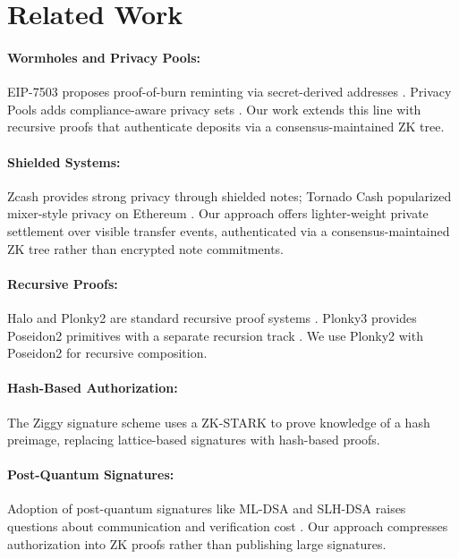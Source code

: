 \documentclass{iacrcc}
\begin{document}
\section{Related Work}
\label{sec:related}

\paragraph{Wormholes and Privacy Pools:}
EIP-7503 proposes proof-of-burn reminting via secret-derived addresses \cite{eip7503}. Privacy Pools adds compliance-aware privacy sets \cite{privacypools}. Our work extends this line with recursive proofs that authenticate deposits via a consensus-maintained ZK tree.

\paragraph{Shielded Systems:}
Zcash provides strong privacy through shielded notes; Tornado Cash popularized mixer-style privacy on Ethereum \cite{zcash,tornadocash}. Our approach offers lighter-weight private settlement over visible transfer events, authenticated via a consensus-maintained ZK tree rather than encrypted note commitments.

\paragraph{Recursive Proofs:}
Halo and Plonky2 are standard recursive proof systems \cite{halo,plonky2}. Plonky3 provides Poseidon2 primitives with a separate recursion track \cite{plonky3}. We use Plonky2 with Poseidon2 for recursive composition.

\paragraph{Hash-Based Authorization:}
The Ziggy signature scheme \cite{ziggy} uses a ZK-STARK to prove knowledge of a hash preimage, replacing lattice-based signatures with hash-based proofs.

\paragraph{Post-Quantum Signatures:}
Adoption of post-quantum signatures like ML-DSA and SLH-DSA raises questions about communication and verification cost \cite{mldsa}. Our approach compresses authorization into ZK proofs rather than publishing large signatures.
\end{document}
